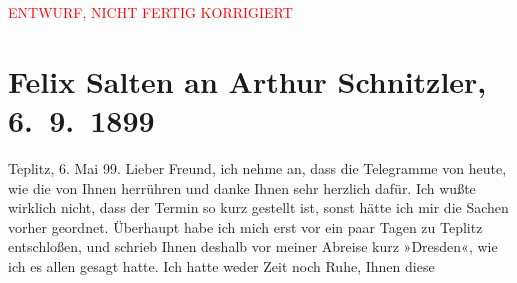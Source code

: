 
\begin{center}
            \textcolor{red}{ENTWURF, NICHT FERTIG KORRIGIERT}
                      \end{center}
            
         \renewcommand{\erwaehnteInstitutionen}{Institutionen: Stadttheater (Teplitz)}
         \renewcommand{\erwaehnteOrte}{Orte: Dresden, Teplice, Wien}
         \renewcommand{\erwaehnteWerke}{}
               \section[Felix Salten an Arthur Schnitzler, 6. 9. 1899]{ Felix Salten an Arthur Schnitzler, 6. 9. 1899}\nopagebreak{}\rehead{ }\begin{ledgroupsized}[t]{13cm}\normalsize\beginnumbering \toendnotes[C]{\smallbreak\pagebreak[2]} 
\toendnotes[C]{\smallbreak}\pstart
           \raggedleft{}{\pb}Teplitz, 6. Mai 99. \pend
           \pstart
           Lieber Freund, ich nehme an, dass die Telegramme von heute, wie die
                  \label{K_L03291-11v}\label{K_L03291-11h} von Ihnen herrühren und
               danke Ihnen sehr herzlich dafür. Ich wußte wirklich nicht, dass der Termin so kurz
               gestellt ist, sonst hätte ich mir die Sachen vorher geordnet. Überhaupt habe ich mich
               erst vor ein paar Tagen zu Teplitz entschloßen,
               und schrieb Ihnen deshalb vor meiner Abreise kurz »Dresden«, wie ich es allen gesagt hatte. Ich hatte {\pb}weder Zeit noch Ruhe, Ihnen
               diese \label{K_L03291-1v}
\end{ledgroupsized}
